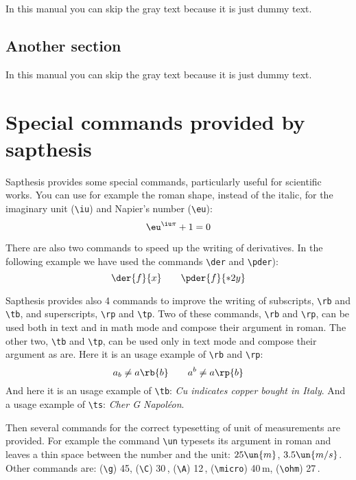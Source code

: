 \documentclass[LaM,binding=0.6cm]{sapthesis}
\newcommand{\bs}{\textbackslash}
\begin{document}
In this manual you can skip the gray text because it is just dummy text.

\textcolor{gray}{\lipsum[1-10]}



\section{Another section}

In this manual you can skip the gray text because it is just dummy text.

\textcolor{gray}{\lipsum}


\appendix
\chapter{Special commands provided by \textsf{sapthesis}}

\textsf{Sapthesis} provides some special commands, particularly useful for scientific works. You can use for example the roman shape, instead of the italic, for the imaginary unit (\texttt{\bs iu}) and Napier's number (\texttt{\bs eu}):
\begin{equation}
\eu^{\iu\pi}+1=0
\end{equation}

There are also two commands to speed up the writing of derivatives. In the following example we have used the commands \texttt{\bs der} and \texttt{\bs pder}):
\begin{equation}
\der{f}{x} \qquad \pder{f}{*{2}{y}}
\end{equation}


\textsf{Sapthesis} provides also 4 commands to improve the writing of subscripts, \texttt{\bs rb} and \texttt{\bs tb}, and superscripts, \texttt{\bs rp} and \texttt{\bs tp}. Two of these commands, \texttt{\bs rb} and \texttt{\bs rp}, can be used both in text and in math mode and compose their argument in roman. The other two, \texttt{\bs tb} and \texttt{\bs tp}, can be used only in text mode and compose their argument as are. Here it is an usage example of \texttt{\bs rb} and \texttt{\bs rp}:
\[
a_b \neq a\rb{b}\qquad a^b \neq a\rp{b}
\]
And here it is an usage example of \texttt{\bs tb}: \emph{Cu indicates copper bought in Italy}. And a usage example of \texttt{\bs ts}: \emph{Cher G Napol\'eon}.


Then several commands for the correct typesetting of unit of measurements are provided. For example the command \texttt{\bs un} typesets its argument in roman and leaves a thin space between the number and the unit: $25\un{m}$, $3.5\un{m/s}$. Other commands are: (\texttt{\bs g}) 45\g, (\texttt{\bs C}) 30\,\C, (\texttt{\bs A}) 12\,\A, (\texttt{\bs micro}) 40\,\micro m, (\texttt{\bs ohm}) 27\,\ohm. 
\end{document}
